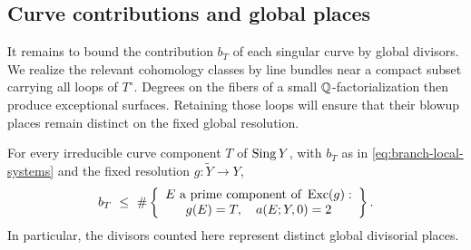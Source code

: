 \subsection{Curve contributions and global places}
\label{subsec:curve-places}

It remains to bound the contribution \(b_T\) of each singular curve by
global divisors.  We realize the relevant cohomology classes by line
bundles near a compact subset carrying all loops of \(T^\circ\).  Degrees
on the fibers of a small \(\mathbb{Q}\)-factorialization then produce exceptional
surfaces.  Retaining those loops will ensure that their blowup places
remain distinct on the fixed global resolution.

\begin{proposition}\label{prop:curve-places}
For every irreducible curve component \(T\) of \(\operatorname{Sing} Y\), with \(b_T\)
as in \eqref{eq:branch-local-systems} and the fixed resolution
\(g:\widetilde Y\to Y\),
\[
 b_T\ \le\
 \#\left\{
 \begin{array}{c}
 E\text{ a prime component of }\operatorname{Exc}(g):\\
 g(E)=T,\quad a(E;Y,0)=2
 \end{array}
 \right\}.
\]
In particular, the divisors counted here represent distinct global
divisorial places.
\end{proposition}

